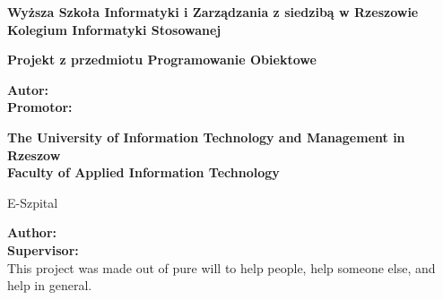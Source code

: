 ﻿%

\listoffigures
\newpage

\noindent
{\footnotesize{}\textbf{Wyższa Szkoła Informatyki i Zarządzania z siedzibą w Rzeszowie\\
Kolegium Informatyki Stosowanej}
\vspace{30pt}

\begin{center}
\textbf{Projekt z przedmiotu Programowanie Obiektowe}\\
\temat
\end{center}

\vspace{30pt}
\noindent
\textbf{Autor: \autor
\\Promotor: \promotor
}
\vspace{120pt}

\noindent
\textbf{The University of Information Technology and Management in Rzeszow\\
Faculty of Applied Information Technology}
\vspace{30pt}

\begin{center}
E-Szpital
\end{center}

\vspace{30pt}
\noindent
\textbf{Author: \autor
\\Supervisor: \promotor
}
\vspace{40pt}
\\This project was made out of pure will to help people, help someone else, and help in general.
}

